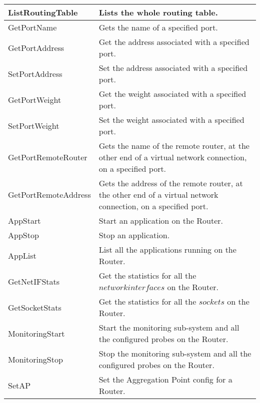 {\begin{longtable}[l]{ | l | p{10cm} | }
ListRoutingTable & Lists the whole routing table. \\
\hline

GetPortName & Gets the name of a specified port. \\
\hline

GetPortAddress & Get the address associated with a specified port.\\
\hline

SetPortAddress & Set the address associated with a specified port.\\
\hline

GetPortWeight & Get the weight associated with a specified port.\\
\hline

SetPortWeight & Set the weight associated with a specified port.\\
\hline

GetPortRemoteRouter & Gets the name of the remote router, at the other
end of a virtual network connection, on a specified port.
\\
\hline

GetPortRemoteAddress &  Gets the address of the remote router, at the other
end of a virtual network connection, on a specified port.
\\
\hline

AppStart & Start an application on the Router. \\
\hline

AppStop & Stop an application. \\
\hline

AppList & List all the applications running on the Router. \\
\hline

GetNetIFStats & Get the statistics for all the $network interfaces$ on
the Router. \\
\hline

GetSocketStats & Get the statistics for all the $sockets$ on
the Router.\\
\hline

MonitoringStart & Start the monitoring sub-system and all the
configured probes on the Router. \\
\hline

MonitoringStop & Stop the monitoring sub-system and all the
configured probes on the Router. \\
\hline

SetAP & Set the Aggregation Point config for a Router. \\
\hline


\end{longtable}}
